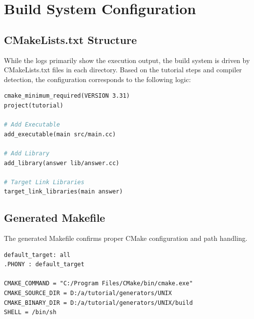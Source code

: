 \section{Build System Configuration}

\subsection{CMakeLists.txt Structure}
While the logs primarily show the execution output, the build system is driven by CMakeLists.txt files in each directory. Based on the tutorial steps and compiler detection, the configuration corresponds to the following logic:

\begin{lstlisting}[language=make, caption=Standard CMakeLists.txt Structure]
cmake_minimum_required(VERSION 3.31)
project(tutorial)

# Add Executable
add_executable(main src/main.cc)

# Add Library
add_library(answer lib/answer.cc)

# Target Link Libraries
target_link_libraries(main answer)
\end{lstlisting}

\subsection{Generated Makefile}
The generated Makefile confirms proper CMake configuration and path handling.

\begin{lstlisting}[breaklines=true, caption=Generated Makefile Structure]
default_target: all
.PHONY : default_target

CMAKE_COMMAND = "C:/Program Files/CMake/bin/cmake.exe"
CMAKE_SOURCE_DIR = D:/a/tutorial/generators/UNIX
CMAKE_BINARY_DIR = D:/a/tutorial/generators/UNIX/build
SHELL = /bin/sh
\end{lstlisting}

